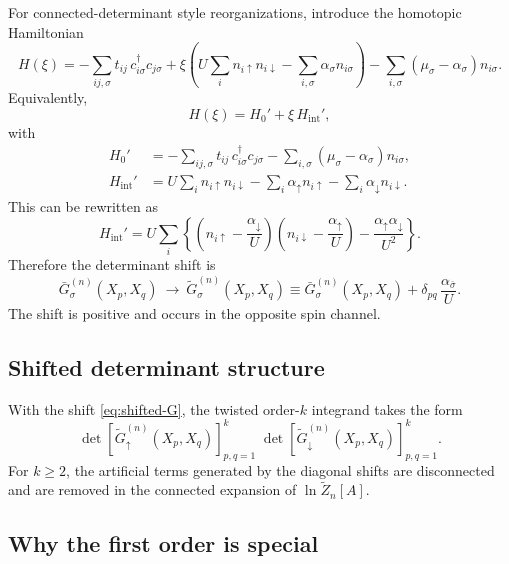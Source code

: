 \documentclass[11pt]{article}
\newcommand{\1}{\mathds{1}}
\newcommand{\up}{\uparrow}
\newcommand{\dn}{\downarrow}
\newcommand{\br}[1]{\left(#1\right)}
\newcommand{\sq}[1]{\left[#1\right]}
\newcommand{\cb}[1]{\left\{#1\right\}}
\begin{document}
For connected-determinant style reorganizations, introduce the homotopic
Hamiltonian
\begin{equation}
H(\xi)
=
-\sum_{ij,\sigma} t_{ij}\, c_{i\sigma}^\dagger c_{j\sigma}
+
\xi\br{
U\sum_i n_{i\up}n_{i\dn}
-
\sum_{i,\sigma}\alpha_\sigma n_{i\sigma}
}
-
\sum_{i,\sigma}(\mu_\sigma-\alpha_\sigma)n_{i\sigma}.
\label{eq:Hxi}
\end{equation}
Equivalently,
\begin{equation}
H(\xi)=H_0' + \xi\,H_{\mathrm{int}}',
\label{eq:Hxi-split}
\end{equation}
with
\begin{align}
H_0'
&=
-\sum_{ij,\sigma} t_{ij}\, c_{i\sigma}^\dagger c_{j\sigma}
-
\sum_{i,\sigma}(\mu_\sigma-\alpha_\sigma)n_{i\sigma},
\label{eq:H0prime}
\\
H_{\mathrm{int}}'
&=
U\sum_i n_{i\up}n_{i\dn}
-
\sum_i \alpha_\up n_{i\up}
-
\sum_i \alpha_\dn n_{i\dn}.
\label{eq:Hintprime}
\end{align}
This can be rewritten as
\begin{equation}
H_{\mathrm{int}}'
=
U\sum_i
\cb{
\br{n_{i\up}-\frac{\alpha_\dn}{U}}
\br{n_{i\dn}-\frac{\alpha_\up}{U}}
-
\frac{\alpha_\up\alpha_\dn}{U^2}
}.
\label{eq:Hint-shifted-factorized}
\end{equation}
Therefore the determinant shift is
\begin{equation}
\boxed{
\bar G_\sigma^{(n)}(X_p,X_q)
\ \longrightarrow\
\widetilde G_\sigma^{(n)}(X_p,X_q)
\equiv
\bar G_\sigma^{(n)}(X_p,X_q)
+
\delta_{pq}\,\frac{\alpha_{\bar\sigma}}{U}.
}
\label{eq:shifted-G}
\end{equation}
The shift is positive and occurs in the opposite spin channel.

\subsection{Shifted determinant structure}

With the shift \eqref{eq:shifted-G}, the twisted order-$k$ integrand takes the
form
\begin{equation}
\det\sq{\widetilde G_{\up}^{(n)}(X_p,X_q)}_{p,q=1}^k
\;
\det\sq{\widetilde G_{\dn}^{(n)}(X_p,X_q)}_{p,q=1}^k.
\label{eq:shifted-determinant}
\end{equation}
For $k\ge 2$, the artificial terms generated by the diagonal shifts are
disconnected and are removed in the connected expansion of
$\ln \widetilde Z_n[A]$.

\subsection{Why the first order is special}
\end{document}
